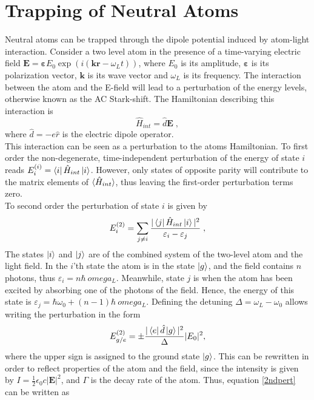\chapter{Trapping of Neutral Atoms}
Neutral atoms can be trapped through the dipole potential induced by atom-light interaction. Consider a two level atom in the presence of a time-varying electric field $\boldsymbol{E} = \boldsymbol{\varepsilon} E_0 \exp{ \left( i(\boldsymbol{k} \boldsymbol{r} - \omega_L t) \right)}$, where $E_0$ is its amplitude, $\boldsymbol{\varepsilon}$ is its polarization vector, $\boldsymbol{k}$ is its wave vector and $\omega_L$ is its frequency. The interaction between the atom and the E-field will lead to a perturbation of the energy levels, otherwise known as the AC Stark-shift. The Hamiltonian describing this interaction is
\begin{equation}
	\hat{H}_{int} = \hat{d} \boldsymbol{E} \; ,
\end{equation}
where $\hat{d} = -e \hat{r}$ is the electric dipole operator.\\
This interaction can be seen as a perturbation to the atoms Hamiltonian. To first order the non-degenerate, time-independent perturbation of the energy of state $i$ reads $E_{i}^{(i)} = \bra{i} \hat{H}_{int} \ket{i}$. However, only states of opposite parity will contribute to the matrix elements of $\braket{\hat{H}_{int}}$, thus leaving the first-order perturbation terms zero.\\
To second order the perturbation of state $i$ is given by
\begin{equation}
	E_i^{(2)} = \sum_{j \neq i} \frac{ |\bra{j} \hat{H}_{int}\ket{i}|^2}{\varepsilon_i - \varepsilon_j} \; ,
\end{equation}
The states $\ket{i}$ and $\ket{j}$ are of the combined system of the two-level atom and the light field. In the $i$'th state the atom is in the state $\ket{g}$, and the field contains $n$ photons, thus $\varepsilon_i = n \hbar \ omega_L$. Meanwhile, state $j$ is when the atom has been excited by absorbing one of the photons of the field. Hence, the energy of this state is $\varepsilon_j = \hbar \omega_0 + (n-1) \hbar \ omega_L$. Defining the detuning $\Delta = \omega_L - \omega_0$ allows writing the perturbation in the form
\begin{equation}
	E_{g/e}^{(2)}=\pm  \frac{ |\bra{e}\hat{d}\ket{g}|^2}{\Delta} |E_0|^2,
	\label{2ndpert}
\end{equation}
where the upper sign is assigned to the ground state $\ket{g}$. This can be rewritten in order to reflect properties of the atom and the field, since the intensity is given by $I = \frac{1}{2} \epsilon_0 c |\boldsymbol{E}|^2 $, and $\Gamma$ is the decay rate of the atom. Thus, equation \ref{2ndpert} can be written as \cite{grimm} 

